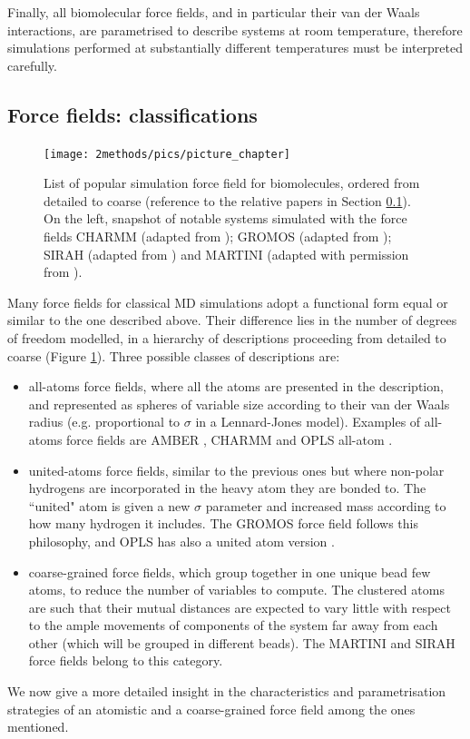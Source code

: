 Finally, all biomolecular force fields, and in particular their van der Waals interactions, are parametrised to describe systems at room temperature, therefore simulations performed at substantially different temperatures must be interpreted carefully.


\subsection{Force fields: classifications} \label{sec:ff_ex}

\begin{figure}
\centering
\texttt{[image: 2methods/pics/picture\_chapter]}
%
\caption[Scheme of popular simulation force field for biomolecules]{List of popular simulation force field for biomolecules, ordered from detailed to coarse (reference to the relative papers in Section \ref{sec:ff_ex}). On the left, snapshot of notable systems simulated with the force fields CHARMM (adapted from \citet{Lipkin2017}); GROMOS (adapted from \citet{Macpherson2019}); SIRAH (adapted from \citet{Machado2017}) and MARTINI (adapted with permission from \citet{Samsudin2017}).}
\label{fig:ff}
\end{figure}

Many force fields for classical MD simulations adopt a functional form equal or similar to the one described above. Their difference lies in the number of degrees of freedom modelled, in a hierarchy of descriptions proceeding from detailed to coarse (Figure \ref{fig:ff}). Three possible classes of descriptions are:
\begin{itemize}
\item all-atoms force fields, where all the atoms are presented in the description, and represented as spheres of variable size according to their van der Waals radius (e.g. proportional to $\sigma$ in a Lennard-Jones model). Examples of all-atoms force fields are AMBER \citep{Maier2015,Dickson2014,Wang2004_amber}, CHARMM \citep{MacKerell1998,Klauda2010,Huang2013} and OPLS all-atom \citep{Jorgensen1988}.
\item united-atoms force fields, similar to the previous ones but where non-polar hydrogens are incorporated in the heavy atom they are bonded to. The ``united" atom is given a new $\sigma$ parameter and increased mass according to how many hydrogen it includes. The GROMOS force field \citep{Oostenbrink2004,Schmid2011} follows this philosophy, and OPLS has also a united atom version \citep{Jorgensen1996}.
\item coarse-grained force fields, which group together in one unique bead few atoms, to reduce the number of variables to compute. The clustered atoms are such that their mutual distances are expected to vary little with respect to the ample movements of components of the system far away from each other (which will be grouped in different beads). The MARTINI \citep{Marrink2007,Monticelli2008,DeJong2013} and SIRAH \citep{Machado2018,Barrera2019} force fields belong to this category.
\end{itemize}
%
We now give a more detailed insight in the characteristics and parametrisation strategies of an atomistic and a coarse-grained force field among the ones mentioned.


